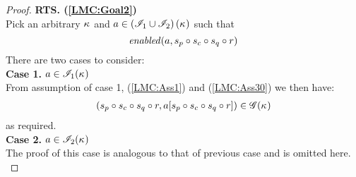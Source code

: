 \begin{lemma}
\begin{proof}
\noindent\textbf{RTS. (\ref{LMC:Goal2})}\\
Pick an arbitrary $\kappa_{}$ and $a \in \left(\mathscr{I}_{1} \cup \mathscr{I}_{2} \right)(\kappa_{})$ such that
\begin{equation}
	\mathit{enabled}(a, s_p \circ s_c \circ s_q \circ r) \label{LMC:Ass30}
\end{equation}
%
There are two cases to consider:\\

\noindent\textbf{Case 1.} $a \in \mathscr{I}_{1}(\kappa_{})$\\
From assumption of case 1, (\ref{LMC:Ass1}) and (\ref{LMC:Ass30}) we then have: 
%
\begin{align*}
	(s_p \circ s_c \circ s_q \circ r, a[s_p \circ s_c \circ s_q \circ r]) \in \mathscr{G}(\kappa_{})
\end{align*}
%
as required. \\

\noindent\textbf{Case 2.} $a \in \mathscr{I}_{2}(\kappa_{})$\\
The proof of this case is analogous to that of previous case and is omitted here.\\
%
%
%
%
%


\end{proof}
\end{lemma}
